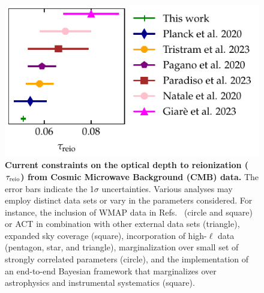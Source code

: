 \begin{figure}[tb]
\centering
\includegraphics{figs/tau_fig.pdf}
\caption{\textbf{Current constraints on the optical depth to
reionization ($\tau_{\mathrm{reio}}$) from Cosmic Microwave Background (CMB)
data.}
The error bars indicate the 1$\sigma$ uncertainties.
Various analyses may employ distinct data sets or vary in the parameters
considered.
For instance, the inclusion of WMAP data in Refs.~ \cite{Natale2020,
Paradiso2023} (circle and square) or ACT in combination with other
external data sets \cite{Giare2023} (triangle), expanded sky coverage
\cite{Paradiso2023} (square), incorporation of high-$\ell$ data
\cite{Pagano2020, Planck2020a, Giare2023} (pentagon, star, and
triangle), marginalization over small set of strongly correlated
parameters \cite{Natale2020} (circle), and the implementation of an
end-to-end Bayesian framework that marginalizes over astrophysics and
instrumental systematics \cite{Paradiso2023} (square).}
\label{fig:tau}
\end{figure}

